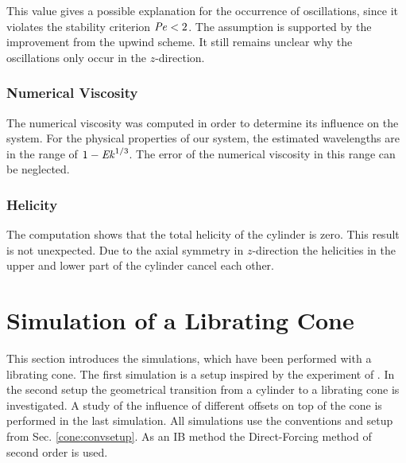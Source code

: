 This value gives a possible explanation for the occurrence of oscillations,
since it violates the stability criterion $\mbox{\textit{Pe}}<2$.
The assumption is supported by the improvement from the upwind scheme.
It still remains unclear why the oscillations only occur in the $z$-direction.


\subsubsection{Numerical Viscosity}

The numerical viscosity was computed in order to determine its influence on the system.
For the physical properties of our system, the estimated wavelengths are in the range of $1 - \mbox{\textit{Ek}}^{1/3}$.
The error of the numerical viscosity in this range can be neglected.

\subsubsection{Helicity}

The computation shows that the total helicity of the cylinder is zero.
This result is not unexpected.
Due to the axial symmetry in $z$-direction the helicities in the upper and lower part of the cylinder cancel each other.

\newpage

\section{Simulation of a Librating Cone}

This section introduces the simulations, which have been performed
with a librating cone. The first simulation is a setup inspired by the experiment of \citep{Beardsley1970}.
In the second setup the geometrical transition from a cylinder to a librating cone is investigated.
A study of the influence of different offsets on top of the cone is performed in the last simulation.
All simulations use the conventions and setup from Sec. \ref{cone:convsetup}.
As an IB method the Direct-Forcing method of second order is used.

